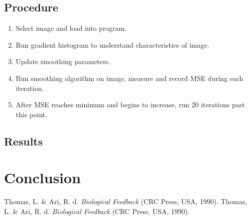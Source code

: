 \documentclass{article}
\begin{document}
  \subsection{Procedure}
  \begin{enumerate}
    \item Select image and load into program.
    \item Run gradient histogram to understand characteristics of image.
    \item Update smoothing parameters.
    \item Run smoothing algorithm on image, measure and record MSE during each iteration.
    \item After MSE reaches minimum and begins to increase, run 20 iterations past this point.
  \end{enumerate}

  \newpage
  \subsection{Results}


  \section{Conclusion}


  \begin{thebibliography}{unsrt}
      Thomas, L. \& Ari, R. d. \emph{Biological Feedback} (CRC Press, USA, 1990).
      Thomas, L. \& Ari, R. d. \emph{Biological Feedback} (CRC Press, USA, 1990).
  \end{thebibliography}
\end{document}
